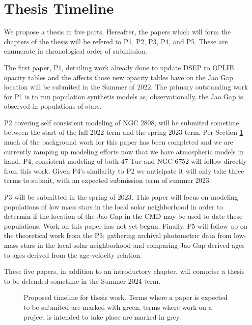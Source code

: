 \section{Thesis Timeline}
We propose a thesis in five parts. Hereafter, the papers which will form the
chapters of the thesis will be refered to P1, P2, P3, P4, and P5. These are
enumerate in chronological order of submission.

The first paper, P1, detailing work already done to update DSEP to OPLIB opacity
tables and the affects those new opacity tables have on the Jao Gap location
will be submited in the Summer of 2022. The primary outstanding work for P1 
is to run population synthetis models as, observationally, the Jao Gap is
observed in populations of stars.

P2 covering self consistent modeling of NGC 2808, will be submited sometime
between the start of the fall 2022 term and the spring 2023 term. Per Section
\ref{} much of the background work for this paper has been completed and we are
currently ramping up modeling efforts now that we have atmospheric models in
hand. P4, consistent modeling of both 47 Tuc and NGC 6752 will follow directly
from this work. Given P4's similarity to P2 we anticipate it will only take
three terms to submit, with an expected submission term of summer 2023.

P3 will be submitted in the spring of 2023. This paper will focus on modeling
populations of low mass stars in the local solar neighborhood in order to
determin if the location of the Jao Gap in the CMD may be used to date these
populations. Work on this paper has not yet begun. Finally, P5 will follow up
on the theoretical work from the P3; gathering archival photometric data from
low-mass stars in the local solar neighborhood and comparing Jao Gap derived
ages to ages derived from the age-velocity relation.

These five papers, in addition to an introductory chapter, will comprise a thesis
to be defended sometime in the Summer 2024 term.

\begin{figure}
	\centering
	
	\caption{Proposed timeline for thesis work. Terms where a paper is expected
	to be submited are marked with green, terms where work on a project is intended
	to take place are marked in grey.}
	\label{fig:timeline}
\end{figure}

